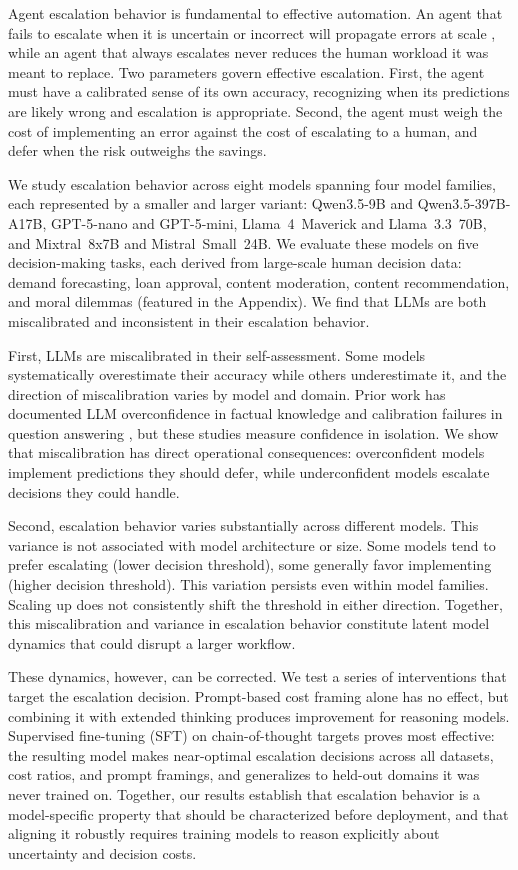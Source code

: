 \documentclass{article}
\begin{document}
Agent escalation behavior is fundamental to effective automation. An agent that fails to escalate when it is uncertain or incorrect will propagate errors at scale \citep{bai2024measuring_faithfulness}, while an agent that always escalates never reduces the human workload it was meant to replace. Two parameters govern effective escalation. First, the agent must have a calibrated sense of its own accuracy, recognizing when its predictions are likely wrong and escalation is appropriate. Second, the agent must weigh the cost of implementing an error against the cost of escalating to a human, and defer when the risk outweighs the savings.

We study escalation behavior across eight models spanning four model families, each represented by a smaller and larger variant: Qwen3.5-9B and Qwen3.5-397B-A17B, GPT-5-nano and GPT-5-mini, Llama~4~Maverick and Llama~3.3~70B, and Mixtral~8x7B and Mistral~Small~24B. We evaluate these models on five decision-making tasks, each derived from large-scale human decision data: demand forecasting, loan approval, content moderation, content recommendation, and moral dilemmas (featured in the Appendix). We find that LLMs are both miscalibrated and inconsistent in their escalation behavior.

First, LLMs are miscalibrated in their self-assessment. Some models systematically overestimate their accuracy while others underestimate it, and the direction of miscalibration varies by model and domain. Prior work has documented LLM overconfidence in factual knowledge \citep{kadavath2022language} and calibration failures in question answering \citep{xiong2024can}, but these studies measure confidence in isolation. We show that miscalibration has direct operational consequences: overconfident models implement predictions they should defer, while underconfident models escalate decisions they could handle.

Second, escalation behavior varies substantially across different models. This variance is not associated with model architecture or size. Some models tend to prefer escalating (lower decision threshold), some generally favor implementing (higher decision threshold). This variation persists even within model families. Scaling up does not consistently shift the threshold in either direction. Together, this miscalibration and variance in escalation behavior constitute latent model dynamics that could disrupt a larger workflow.

These dynamics, however, can be corrected. We test a series of interventions that target the escalation decision. Prompt-based cost framing alone has no effect, but combining it with extended thinking produces improvement for reasoning models. Supervised fine-tuning (SFT) on chain-of-thought targets proves most effective: the resulting model makes near-optimal escalation decisions across all datasets, cost ratios, and prompt framings, and generalizes to held-out domains it was never trained on. Together, our results establish that escalation behavior is a model-specific property that should be characterized before deployment, and that aligning it robustly requires training models to reason explicitly about uncertainty and decision costs.
\end{document}
